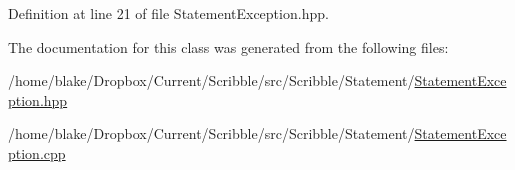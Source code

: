 Definition at line 21 of file Statement\-Exception.\-hpp.



The documentation for this class was generated from the following files\-:\begin{DoxyCompactItemize}
\item 
/home/blake/\-Dropbox/\-Current/\-Scribble/src/\-Scribble/\-Statement/\hyperlink{_statement_exception_8hpp}{Statement\-Exception.\-hpp}\item 
/home/blake/\-Dropbox/\-Current/\-Scribble/src/\-Scribble/\-Statement/\hyperlink{_statement_exception_8cpp}{Statement\-Exception.\-cpp}\end{DoxyCompactItemize}
